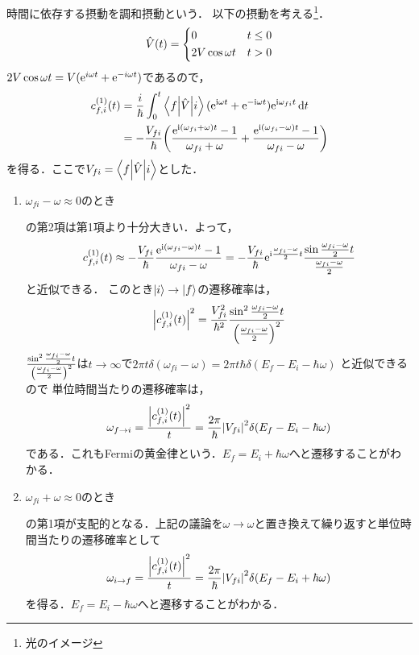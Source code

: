 \documentclass{report}
\begin{document}
  時間に依存する摂動を調和摂動という．
  以下の摂動を考える\footnote{光のイメージ}．
  \begin{align}
    \hat{V}(t) = 
    \begin{dcases}
      0 & t\leq 0 \\
      2V\cos\omega t & t > 0
    \end{dcases}
  \end{align}
  $2V\cos\omega t = V(\mathrm{e}^{i\omega t} + \mathrm{e}^{-i\omega t})$であるので，
  \begin{align}
    c^{(1)}_{f, i}(t) &= \frac{i}{\hbar}\int_{0}^{t}\mel**{f}{\hat{V}}{i}(\mathrm{e}^{\mathrm{i}\omega t} + \mathrm{e}^{-\mathrm{i}\omega t})\mathrm{e}^{\mathrm{i}\omega_{fi}t}\dd{t} \label{3.6} \\
    &= -\frac{V_{fi}}{\hbar}\qty(\frac{\mathrm{e}^{\mathrm{i}(\omega_{fi} + \omega)t} - 1}{\omega_{fi} + \omega} + \frac{\mathrm{e}^{\mathrm{i}(\omega_{fi} - \omega)t} - 1}{\omega_{fi} - \omega})
  \end{align}
  を得る．ここで$V_{fi} = \mel**{f}{\hat{V}}{i}$とした．
  \begin{enumerate}
    \item $\omega_{fi} - \omega \approx 0$のとき\par
      の第2項は第1項より十分大きい．よって，
      \begin{align}
        c_{f, i}^{(1)}(t)\approx - \frac{V_{fi}}{\hbar}\frac{\mathrm{e}^{\mathrm{i}(\omega_{fi} - \omega)t} - 1}{\omega_{fi} - \omega} = -\frac{V_{fi}}{\hbar}\mathrm{e}^{\mathrm{i}\frac{\omega_{fi} - \omega}{2}t}\frac{\sin\frac{\omega_{fi} - \omega}{2}t}{\frac{\omega_{fi} - \omega}{2}}
      \end{align}
      と近似できる．
      このとき$\ket{i}\to\ket{f}$の遷移確率は，
      \begin{align}
        \abs{c_{f, i}^{(1)}(t)}^2 = \frac{V_{fi}^2}{\hbar^2}\frac{\sin^2\frac{\omega_{fi} - \omega}{2}t}{\qty(\frac{\omega_{fi} - \omega}{2})^2}
      \end{align}
      $\frac{\sin^2\frac{\omega_{fi} - \omega}{2}t}{\qty(\frac{\omega_{fi} - \omega}{2})^2}$は$t\to\infty$で$2\pi t\delta(\omega_{fi} - \omega) = 2\pi t\hbar\delta(E_f - E_i - \hbar\omega)$
      と近似できるので
      単位時間当たりの遷移確率は，
      \begin{align}
        \omega_{f\to i} = \frac{\abs{c_{f, i}^{(1)}(t)}^2}{t} = \frac{2\pi}{\hbar}\abs{V_{fi}}^2\delta(E_f - E_i - \hbar\omega)
      \end{align}
      である．これもFermiの黄金律という．$E_f = E_i + \hbar\omega$へと遷移することがわかる．
    \item $\omega_{fi} + \omega\approx 0$のとき\par
      の第1項が支配的となる．上記の議論を$\omega\to\omega$と置き換えて繰り返すと単位時間当たりの遷移確率として
      \begin{align}
        \omega_{i\to f} = \frac{\abs{c_{f,i}^{(1)}(t)}^2}{t} = \frac{2\pi}{\hbar}\abs{V_{fi}}^2\delta(E_f - E_i + \hbar\omega)
      \end{align}
      を得る．$E_f = E_i - \hbar\omega$へと遷移することがわかる．
  \end{enumerate}
\end{document}
